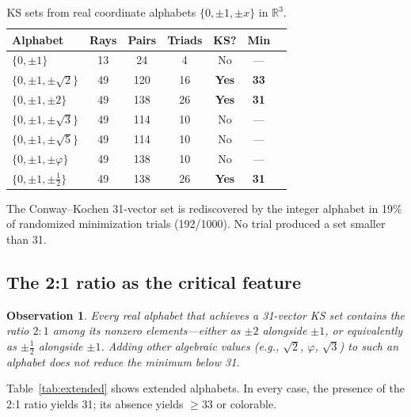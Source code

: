 \documentclass[12pt,a4paper]{article}
\newtheorem{observation}[theorem]{Observation}
\newcommand{\R}{\mathbb{R}}
\begin{document}
\begin{table}[ht]
\centering
\caption{KS sets from real coordinate alphabets $\{0, \pm 1, \pm x\}$ in $\R^3$.}
\label{tab:alphabets}
\begin{tabular}{lcccccc}
\toprule
Alphabet & Rays & Pairs & Triads & KS? & Min \\
\midrule
$\{0, \pm 1\}$ & 13 & 24 & 4 & No & --- \\
$\{0, \pm 1, \pm\sqrt{2}\}$ & 49 & 120 & 16 & \textbf{Yes} & \textbf{33} \\
$\{0, \pm 1, \pm 2\}$ & 49 & 138 & 26 & \textbf{Yes} & \textbf{31} \\
$\{0, \pm 1, \pm\sqrt{3}\}$ & 49 & 114 & 10 & No & --- \\
$\{0, \pm 1, \pm\sqrt{5}\}$ & 49 & 114 & 10 & No & --- \\
$\{0, \pm 1, \pm\varphi\}$ & 49 & 138 & 10 & No & --- \\
$\{0, \pm 1, \pm\frac{1}{2}\}$ & 49 & 138 & 26 & \textbf{Yes} & \textbf{31} \\
\bottomrule
\end{tabular}
\end{table}

The Conway--Kochen 31-vector set is rediscovered by the integer alphabet in 19\% of randomized minimization trials (192/1000). No trial produced a set smaller than 31.

\subsection{The 2:1 ratio as the critical feature}\label{sec:ratio}

\begin{observation}
Every real alphabet that achieves a 31-vector KS set contains the ratio $2{:}1$ among its nonzero elements---either as $\pm 2$ alongside $\pm 1$, or equivalently as $\pm \frac{1}{2}$ alongside $\pm 1$. Adding other algebraic values (e.g., $\sqrt{2}$, $\varphi$, $\sqrt{3}$) to such an alphabet does not reduce the minimum below 31.
\end{observation}

Table~\ref{tab:extended} shows extended alphabets. In every case, the presence of the 2:1 ratio yields 31; its absence yields $\geq 33$ or colorable.
\end{document}
